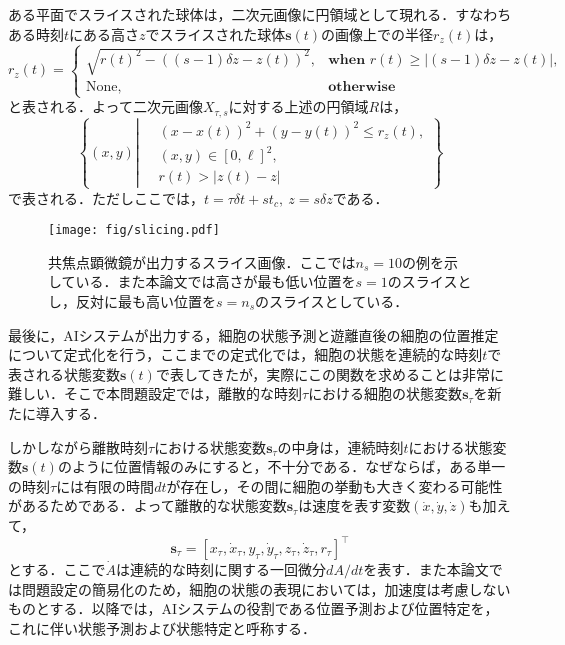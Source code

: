 ある平面でスライスされた球体は，二次元画像に円領域として現れる．すなわちある時刻$t$にある高さ$z$でスライスされた球体$\bm{s}(t)$の画像上での半径$r_{z}(t)$は，
\begin{equation}
    \label{eq:appearant_radius}
    r_{z}(t) = 
    \begin{cases}
        \sqrt{r(t)^2 - \left((s - 1)\delta z - z(t)\right)^2}, & \textbf{when } r(t) \geq \left|(s - 1)\delta z - z(t)\right|,
        \\ \text{None}, & \textbf{otherwise}
    \end{cases}
\end{equation}
と表される．よって二次元画像$X_{\tau, s}$に対する上述の円領域$R$は，
\begin{equation}
    \label{eq:circle_region}
    \left\{ (x, y) \left| ~ 
        \begin{aligned}
            &(x - x(t))^2 + (y - y(t))^2 \leq r_z(t),
            \\ & (x, y) \in [0, \ell]^2,
            \\ & r(t) > \left|z(t) - z\right|
        \end{aligned}
    \right.
    \right\}
\end{equation}
で表される．ただしここでは，$t = \tau \delta t + s t_c, ~ z = s \delta z$である．

\begin{figure}[t]
    \centering
    \texttt{[image: fig/slicing.pdf]}
    \caption[共焦点顕微鏡が出力するスライス画像]{共焦点顕微鏡が出力するスライス画像．ここでは$n_s=10$の例を示している．また本論文では高さが最も低い位置を$s=1$のスライスとし，反対に最も高い位置を$s=n_s$のスライスとしている．}
    \label{fig:sliced_image}
\end{figure}

最後に，AIシステムが出力する，細胞の状態予測と遊離直後の細胞の位置推定について定式化を行う，ここまでの定式化では，細胞の状態を連続的な時刻$t$で表される状態変数$\bm{s}(t)$で表してきたが，実際にこの関数を求めることは非常に難しい．そこで本問題設定では，離散的な時刻$\tau$における細胞の状態変数$\bm{s}_{\tau}$を新たに導入する．

しかしながら離散時刻$\tau$における状態変数$\bm{s}_{\tau}$の中身は，連続時刻$t$における状態変数$\bm{s}(t)$のように位置情報のみにすると，不十分である．なぜならば，ある単一の時刻$\tau$には有限の時間$dt$が存在し，その間に細胞の挙動も大きく変わる可能性があるためである．よって離散的な状態変数$\bm{s}_{\tau}$は速度を表す変数$(\dot{x}, \dot{y}, \dot{z})$も加えて，
\begin{equation}
    \label{eq:discreted_state_vector}
    \bm{s}_{\tau} = \left[x_{\tau}, \dot{x}_{\tau}, y_{\tau}, \dot{y}_{\tau}, z_{\tau}, \dot{z}_{\tau}, r_{\tau}\right]^{\top}
\end{equation}
とする．ここで$\dot{A}$は連続的な時刻に関する一回微分$dA/dt$を表す．また本論文では問題設定の簡易化のため，細胞の状態の表現においては，加速度は考慮しないものとする．以降では，AIシステムの役割である位置予測および位置特定を，これに伴い状態予測および状態特定と呼称する．

